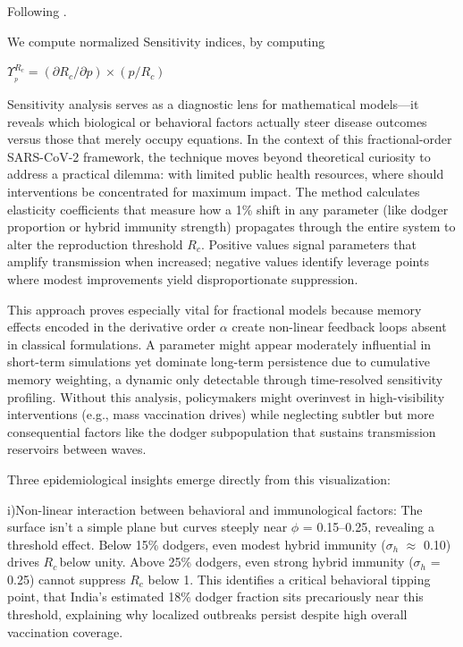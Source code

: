 \documentclass[10pt]{NSP1}
\begin{document}
\noindent Following \cite{ref58}.

We compute normalized Sensitivity indices, by computing

\(\Upsilon_{_p}^{R_{c}} = \left( \partial R_{c}/\partial p \right) \times \left( p/R_{c} \right)\)

Sensitivity analysis serves as a diagnostic lens for mathematical models---it reveals which biological or behavioral factors actually steer disease outcomes versus those that merely occupy equations. In the context of this fractional-order SARS-CoV-2 framework, the technique moves beyond theoretical curiosity to address a practical dilemma: with limited public health resources, where should interventions be concentrated for maximum impact. The method calculates elasticity coefficients that measure how a 1\% shift in any parameter (like dodger proportion or hybrid immunity strength) propagates through the entire system to alter the reproduction threshold \(R_{c}\). Positive values signal parameters that amplify transmission when increased; negative values identify leverage points where modest improvements yield disproportionate suppression.

This approach proves especially vital for fractional models because memory effects encoded in the derivative order $\alpha$ create non-linear feedback loops absent in classical formulations. A parameter might appear moderately influential in short-term simulations yet dominate long-term persistence due to cumulative memory weighting, a dynamic only detectable through time-resolved sensitivity profiling. Without this analysis, policymakers might overinvest in high-visibility interventions (e.g., mass vaccination drives) while neglecting subtler but more consequential factors like the dodger subpopulation that sustains transmission reservoirs between waves.

\setlength{\intextsep}{6pt} 

Three epidemiological insights emerge directly from this visualization:

i)Non-linear interaction between behavioral and immunological factors: The surface isn't a simple plane but curves steeply near $\phi$ = 0.15--0.25, revealing a threshold effect. Below 15\% dodgers, even modest hybrid immunity ($\sigma_{h}$ $\approx$ 0.10) drives \(R_{c\ }\)below unity. Above 25\% dodgers, even strong hybrid immunity ($\sigma_{h}$ = 0.25) cannot suppress \(R_{c}\) below 1. This identifies a critical behavioral tipping point, that India's estimated 18\% dodger fraction sits precariously near this threshold, explaining why localized outbreaks persist despite high overall vaccination coverage.
\end{document}

